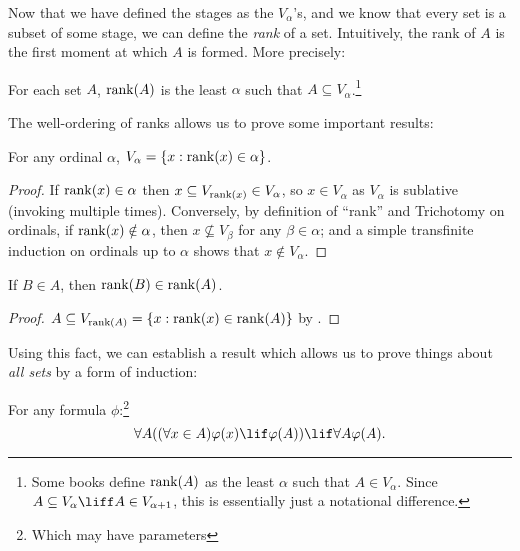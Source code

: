\documentclass[../../../include/open-logic-section]{subfiles}
\begin{document}

Now that we have defined the stages as the $V_\alpha$'s, and we know
that every set is a subset of some stage, we can define the
\emph{rank} of a set. Intuitively, the rank of $A$ is the first moment
at which $A$ is formed. More precisely:

\begin{defn}
For each set $A$, $\mathrm{rank}(A)$ is the least $\alpha$ such that $A
\subseteq V_\alpha$.\footnote{Some books define $\mathrm{rank}(A)$ as the
least $\alpha$ such that $A \in V_\alpha$. Since $A \subseteq V_\alpha
\liff A \in V_{\alpha+1}$, this is essentially just a notational
difference.}
\end{defn}

The well-ordering of ranks allows us to prove some important results:
\begin{prop}
For any ordinal $\alpha$, $V_\alpha = \{ x : \mathrm{rank}(x) \in \alpha \}$.
\end{prop}

\begin{proof}
If $\mathrm{rank}(x) \in \alpha$ then $x \subseteq V_{\mathrm{rank}(x)} \in
V_\alpha$, so $x \in V_\alpha$ as $V_\alpha$ is sublative (invoking
 multiple times). Conversely, by
definition of ``rank'' and Trichotomy on ordinals, if $\mathrm{rank}(x)
\notin  \alpha$, then $x \nsubseteq V_\beta$ for any $\beta \in
\alpha$; and a simple transfinite induction on ordinals up to $\alpha$
shows that $x \notin V_\alpha$. 
\end{proof}

\begin{prop}
If $B \in A$, then $\mathrm{rank}(B) \in \mathrm{rank}(A)$.
\end{prop}

\begin{proof}
$A \subseteq V_{\mathrm{rank}(A)} = \{ x : \mathrm{rank}(x) \in
\mathrm{rank}(A) \}$ by .
\end{proof}

Using this fact, we can establish a result which allows us to prove
things about \emph{all sets} by a form of induction:

\begin{thm} 
For any formula $\phi$:\footnote{Which may have parameters}
\[
	\forall A((\forall x \in A)\phi(x) \lif \phi(A)) \lif \forall A \phi(A).
\]
\end{thm}
\end{document}
